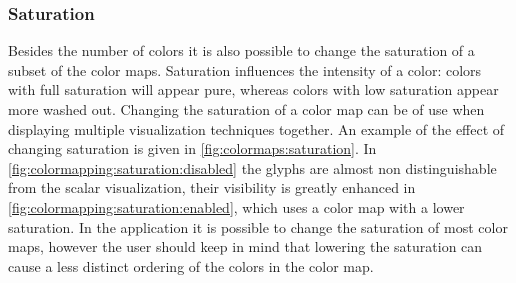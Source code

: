 \subsubsection{Saturation} %
\label{ssub:saturation}
Besides the number of colors it is also possible to change the saturation of a subset of the color maps. Saturation influences the intensity of a color: colors with full saturation will appear pure, whereas colors with low saturation appear more washed out. Changing the saturation of a color map can be of use when displaying multiple visualization techniques together. An example of the effect of changing saturation is given in \cref{fig:colormaps:saturation}. In \cref{fig:colormapping:saturation:disabled} the glyphs are almost non distinguishable from the scalar visualization, their visibility is greatly enhanced in \cref{fig:colormapping:saturation:enabled}, which uses a color map with a lower saturation. In the application it is possible to change the saturation of most color maps, however the user should keep in mind that lowering the saturation can cause a less distinct ordering of the colors in the color map.

